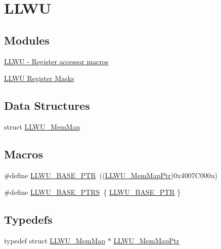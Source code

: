 \hypertarget{group___l_l_w_u___peripheral}{}\section{L\+L\+W\+U}
\label{group___l_l_w_u___peripheral}
\subsection*{Modules}
\begin{DoxyCompactItemize}
\item 
\hyperlink{group___l_l_w_u___register___accessor___macros}{L\+L\+W\+U -\/ Register accessor macros}
\item 
\hyperlink{group___l_l_w_u___register___masks}{L\+L\+W\+U Register Masks}
\end{DoxyCompactItemize}
\subsection*{Data Structures}
\begin{DoxyCompactItemize}
\item 
struct \hyperlink{struct_l_l_w_u___mem_map}{L\+L\+W\+U\+\_\+\+Mem\+Map}
\end{DoxyCompactItemize}
\subsection*{Macros}
\begin{DoxyCompactItemize}
\item 
\#define \hyperlink{group___l_l_w_u___peripheral_ga89c97b9e8756088cb3d8617c022ae6ac}{L\+L\+W\+U\+\_\+\+B\+A\+S\+E\+\_\+\+P\+T\+R}~((\hyperlink{group___l_l_w_u___peripheral_ga03cfefad45ecbfeb2cd16eb85ccfe186}{L\+L\+W\+U\+\_\+\+Mem\+Map\+Ptr})0x4007\+C000u)
\item 
\#define \hyperlink{group___l_l_w_u___peripheral_ga4826d688973513cc02a2f1d4f67c336b}{L\+L\+W\+U\+\_\+\+B\+A\+S\+E\+\_\+\+P\+T\+R\+S}~\{ \hyperlink{group___l_l_w_u___peripheral_ga89c97b9e8756088cb3d8617c022ae6ac}{L\+L\+W\+U\+\_\+\+B\+A\+S\+E\+\_\+\+P\+T\+R} \}
\end{DoxyCompactItemize}
\subsection*{Typedefs}
\begin{DoxyCompactItemize}
\item 
typedef struct \hyperlink{struct_l_l_w_u___mem_map}{L\+L\+W\+U\+\_\+\+Mem\+Map} $\ast$ \hyperlink{group___l_l_w_u___peripheral_ga03cfefad45ecbfeb2cd16eb85ccfe186}{L\+L\+W\+U\+\_\+\+Mem\+Map\+Ptr}
\end{DoxyCompactItemize}


